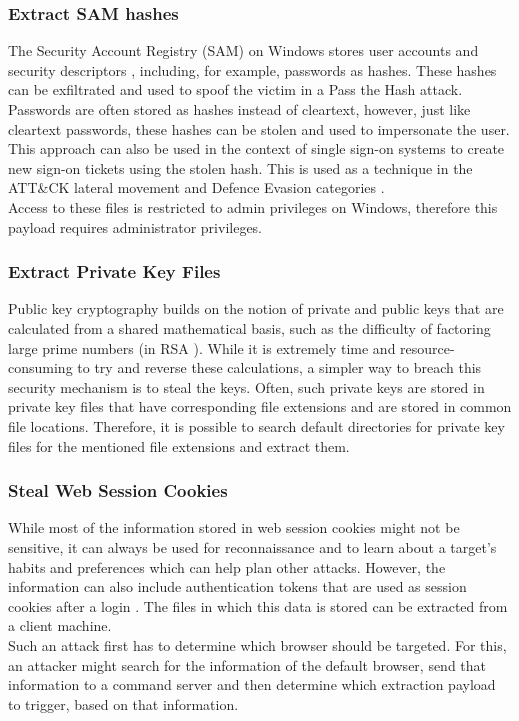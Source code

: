 \subsubsection{Extract SAM hashes}

The Security Account Registry (SAM) on Windows stores user accounts and security descriptors \cite{archiveddocsSecurityAccountManager2009}, including, for example, passwords as hashes. These hashes can be exfiltrated and used to spoof the victim in a Pass the Hash attack. Passwords are often stored as hashes instead of cleartext, however, just like cleartext passwords, these hashes can be stolen and used to impersonate the user. This approach can also be used in the context of single sign-on systems to create new sign-on tickets using the stolen hash. This is used as a technique in the ATT\&CK lateral movement and Defence Evasion categories \cite{UseAlternateAuthentication}. \\
Access to these files is restricted to admin privileges on Windows, therefore this payload requires administrator privileges.

\subsubsection{Extract Private Key Files}

Public key cryptography builds on the notion of private and public keys that are calculated from a shared mathematical basis, such as the difficulty of factoring large prime numbers (in RSA \cite{rivestMethodObtainingDigital1978}). While it is extremely time and resource-consuming to try and reverse these calculations, a simpler way to breach this security mechanism is to steal the keys. Often, such private keys are stored in private key files that have corresponding file extensions and are stored in common file locations. Therefore, it is possible to search default directories for private key files for the mentioned file extensions and extract them.    


\subsubsection{Steal Web Session Cookies}

While most of the information stored in web session cookies might not be sensitive, it can always be used for reconnaissance and to learn about a target's habits and preferences which can help plan other attacks. However, the information can also include authentication tokens that are used as session cookies after a login \cite{StealWebSession}. The files in which this data is stored can be extracted from a client machine. \\
Such an attack first has to determine which browser should be targeted. For this, an attacker might search for the information of the default browser, send that information to a command server and then determine which extraction payload to trigger, based on that information. 


